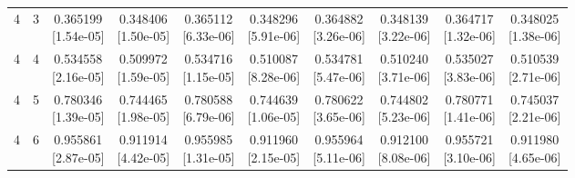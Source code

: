 \documentclass[12pt,letterpaper]{article}
\theoremstyle{plain}
\theoremstyle{definition}
\begin{document}
\begin{table}[p]
\begin{adjustbox}{max width=\linewidth}
\begin{tabular}{@{}rr*{8}{c}@{}}
4 & 3 & \shortstack{0.365199\\[-1pt]{\scriptsize[1.54e-05]}} & \shortstack{0.348406\\[-1pt]{\scriptsize[1.50e-05]}} & \shortstack{0.365112\\[-1pt]{\scriptsize[6.33e-06]}} & \shortstack{0.348296\\[-1pt]{\scriptsize[5.91e-06]}} & \shortstack{0.364882\\[-1pt]{\scriptsize[3.26e-06]}} & \shortstack{0.348139\\[-1pt]{\scriptsize[3.22e-06]}} & \shortstack{0.364717\\[-1pt]{\scriptsize[1.32e-06]}} & \shortstack{0.348025\\[-1pt]{\scriptsize[1.38e-06]}}\\
4 & 4 & \shortstack{0.534558\\[-1pt]{\scriptsize[2.16e-05]}} & \shortstack{0.509972\\[-1pt]{\scriptsize[1.59e-05]}} & \shortstack{0.534716\\[-1pt]{\scriptsize[1.15e-05]}} & \shortstack{0.510087\\[-1pt]{\scriptsize[8.28e-06]}} & \shortstack{0.534781\\[-1pt]{\scriptsize[5.47e-06]}} & \shortstack{0.510240\\[-1pt]{\scriptsize[3.71e-06]}} & \shortstack{0.535027\\[-1pt]{\scriptsize[3.83e-06]}} & \shortstack{0.510539\\[-1pt]{\scriptsize[2.71e-06]}}\\
4 & 5 & \shortstack{0.780346\\[-1pt]{\scriptsize[1.39e-05]}} & \shortstack{0.744465\\[-1pt]{\scriptsize[1.98e-05]}} & \shortstack{0.780588\\[-1pt]{\scriptsize[6.79e-06]}} & \shortstack{0.744639\\[-1pt]{\scriptsize[1.06e-05]}} & \shortstack{0.780622\\[-1pt]{\scriptsize[3.65e-06]}} & \shortstack{0.744802\\[-1pt]{\scriptsize[5.23e-06]}} & \shortstack{0.780771\\[-1pt]{\scriptsize[1.41e-06]}} & \shortstack{0.745037\\[-1pt]{\scriptsize[2.21e-06]}}\\
4 & 6 & \shortstack{0.955861\\[-1pt]{\scriptsize[2.87e-05]}} & \shortstack{0.911914\\[-1pt]{\scriptsize[4.42e-05]}} & \shortstack{0.955985\\[-1pt]{\scriptsize[1.31e-05]}} & \shortstack{0.911960\\[-1pt]{\scriptsize[2.15e-05]}} & \shortstack{0.955964\\[-1pt]{\scriptsize[5.11e-06]}} & \shortstack{0.912100\\[-1pt]{\scriptsize[8.08e-06]}} & \shortstack{0.955721\\[-1pt]{\scriptsize[3.10e-06]}} & \shortstack{0.911980\\[-1pt]{\scriptsize[4.65e-06]}}\\

\end{tabular}
\end{adjustbox}
\end{table}
\end{document}

